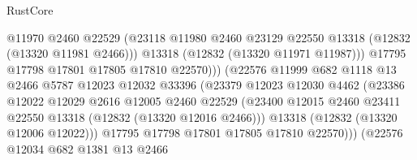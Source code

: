 \begin{lexlean}{RustCore}
\begin{coremodule}
                                      @11970
                                      @2460
                                      @22529
                                      (@23118
                                        @11980
                                        @2460
                                        @23129
                                        @22550
                                        @13318
                                        (@12832 (@13320 @11981 @2466)))
                                      @13318
                                      (@12832 (@13320 @11971 @11987)))
                                    @17795
                                    @17798
                                    @17801
                                    @17805
                                    @17810
                                    @22570)))
                              (@22576
                                @11999
                                @682
                                @1118
                                @13
                                @2466
                                @5787
                                @12023
                                @12032
                                @33396
                                (@23379
                                  @12023
                                  @12030
                                  @4462
                                  (@23386
                                    @12022
                                    @12029
                                    @2616
                                    @12005
                                    @2460
                                    @22529
                                    (@23400
                                      @12015
                                      @2460
                                      @23411
                                      @22550
                                      @13318
                                      (@12832 (@13320 @12016 @2466)))
                                    @13318
                                    (@12832 (@13320 @12006 @12022)))
                                  @17795
                                  @17798
                                  @17801
                                  @17805
                                  @17810
                                  @22570)))
                            (@22576
                              @12034
                              @682
                              @1381
                              @13
                              @2466

\end{coremodule}
\end{lexlean}
